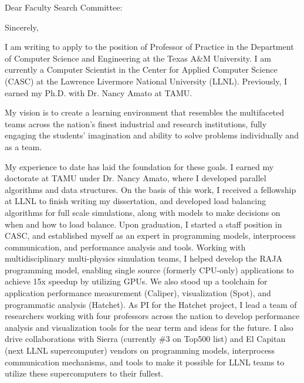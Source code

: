 \documentclass[10pt,letterpaper]{moderncv/moderncv}
\begin{document}
\date{January 20, 2021}
\opening{Dear Faculty Search Committee:}
\closing{Sincerely,}
\makelettertitle%



I am writing to apply to the position of Professor of Practice in the Department of Computer Science and Engineering at the Texas A\&M University.  I am currently a Computer Scientist in the Center for Applied Computer Science (CASC) at the Lawrence Livermore National University (LLNL).  Previously, I earned my Ph.D. with Dr. Nancy Amato at TAMU.

My vision is to create a learning environment that resembles the multifaceted teams across the nation's finest industrial and research institutions,
fully engaging the students' imagination and ability to solve problems individually and as a team.

My experience to date has laid the foundation for these goals.  I earned my doctorate at TAMU under Dr. Nancy Amato, where I developed parallel algorithms and data structures.
On the basis of this work, I received a fellowship at LLNL to finish writing my dissertation,
and developed load balancing algorithms for full scale simulations, along with models to make decisions on when and how to load balance.
Upon graduation, I started a staff position in CASC, and established myself as an expert
in programming models, interprocess communication, and performance analysis and tools.
Working with multidisciplinary multi-physics simulation teams,
I helped develop the RAJA programming model, enabling single source (formerly CPU-only) applications
to achieve 15x speedup by utilizing GPUs.
We also stood up a toolchain for application performance measurement (Caliper),
visualization (Spot), and programmatic analysis (Hatchet).
As PI for the Hatchet project, I lead a team of researchers working with four professors across the nation
to develop performance analysis and visualization tools for the near term and ideas for the future.
I also drive collaborations with Sierra (currently \#3 on Top500 list) and El Capitan (next LLNL supercomputer) vendors
on programming models, interprocess communication mechanisms, and tools to make it possible for LLNL teams to utilize these supercomputers to their fullest.
\end{document}
